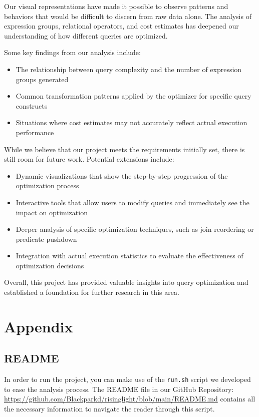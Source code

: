 \documentclass[a4paper,12pt]{scrreprt}
\begin{document}
Our visual representations have made it possible to observe patterns and behaviors that would be difficult to discern from raw data alone. The analysis of expression groups, relational operators, and cost estimates has deepened our understanding of how different queries are optimized.

Some key findings from our analysis include:
\begin{itemize}
    \item The relationship between query complexity and the number of expression groups generated
    \item Common transformation patterns applied by the optimizer for specific query constructs
    \item Situations where cost estimates may not accurately reflect actual execution performance
\end{itemize}

While we believe that our project meets the requirements initially set, there is still room for future work. Potential extensions include:
\begin{itemize}
    \item Dynamic visualizations that show the step-by-step progression of the optimization process
    \item Interactive tools that allow users to modify queries and immediately see the impact on optimization
    \item Deeper analysis of specific optimization techniques, such as join reordering or predicate pushdown
    \item Integration with actual execution statistics to evaluate the effectiveness of optimization decisions
\end{itemize}

Overall, this project has provided valuable insights into query optimization and established a foundation for further research in this area.

\appendix

\chapter{Appendix}
\thispagestyle{fancy}

\section{README}

In order to run the project, you can make use of the \texttt{run.sh} script we developed to ease the analysis process. The README file in our GitHub Repository: \url{https://github.com/Blackparkd/risinglight/blob/main/README.md} contains all the necessary information to navigate the reader through this script. \\
\end{document}
